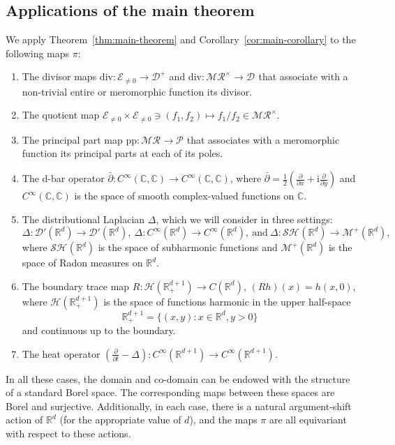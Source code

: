 \documentclass[12pt]{paper}
\numberwithin{equation}{section}
\theoremstyle{plain}
\theoremstyle{definition}
\newcommand{\C}{\mathbb{C}}
\newcommand{\R}{\mathbb{R}}
\newcommand{\Rd}{\mathbb{R}^{d}}
\newcommand{\im}{\mathrm{i}} %
\newcommand{\smooth}[2][]{C^{\infty}_{#1}(#2)}
\newcommand{\smoothCC}{\smooth{\C,\C}}
\newcommand{\measp}[2][]{\mathcal{M}_{#1}^+(#2)}
\newcommand{\distrib}[1]{\mathscr{D}'(#1)}
\newcommand{\merom}[1][]{\mathcal{MR}_{#1}}
\newcommand{\meromnz}{\merom^{\times}}
\newcommand{\holom}[1][]{\mathcal{E}_{#1}}
\newcommand{\divis}[1][]{\mathcal{D}_{#1}}
\newcommand{\divisp}[1][]{\divis[#1]^{+}}
\newcommand{\ppart}{\mathcal{P}}
\newcommand{\sharm}[2][]{\mathcal{SH}_{#1}(#2)}
\newcommand{\dm}{\mathrm{div}}      %
\newcommand{\ppm}{\mathrm{pp}}      %
\begin{document}
\subsection{Applications of the main theorem}
\noindent We apply Theorem~\ref{thm:main-theorem} and Corollary~\ref{cor:main-corollary} to the
following maps \(\pi\):
\begin{enumerate}[leftmargin=.6cm, label={\sf \arabic*}., ref={\sf \arabic*}]
\item The divisor maps \(\dm : \holom[\ne 0] \to \divisp\) and \(\dm : \meromnz \to \divis\) that
  associate with a non-trivial entire or meromorphic function its divisor.
\item The quotient map \(\holom[\ne 0] \times \holom[\ne 0] \ni (f_{1}, f_{2}) \mapsto f_{1}/f_{2}
  \in \meromnz\).
\item The principal part map \(\ppm : \merom \to \ppart\) that associates with a meromorphic
  function its principal parts at each of its poles.
\item The d-bar operator \(\bar{\partial} : \smoothCC \to \smoothCC\), where
  \(\bar{\partial} = \frac{1}{2}(\frac{\partial}{\partial x} + \im \frac{\partial}{\partial y})\)
  and \(\smoothCC\) is the space of smooth complex-valued functions on \(\C\).
\item The distributional Laplacian \( \Delta \), which we will consider in three settings:
  \[ \Delta: \distrib{\Rd} \to \distrib{\Rd} ,\ \Delta\colon C^\infty(\Rd) \to C^\infty(\Rd) , \
    \text{and} \ \Delta : \sharm{\Rd} \to \measp{\Rd},\]
  where \(\sharm{\Rd}\) is the space of subharmonic functions and \(\measp{\Rd}\) is the space of
  Radon measures on \(\Rd\).
\item The boundary trace map \( R: \mathcal H (\R^{d+1}_+) \to C(\Rd) \), \( (Rh)(x)=h(x, 0) \),
  where \( \mathcal H(\R^{d+1}_+) \) is the space of functions harmonic in the upper half-space
  \[ \R^{d+1}_+ = \{(x, y): x\in\Rd, y>0 \} \] and continuous up to the boundary.
\item The heat operator
  \((\frac{\partial}{\partial t} - \Delta) : \smooth{\R^{d+1}} \to \smooth{\R^{d+1}}\).
\end{enumerate}

In all these cases, the domain and co-domain can be endowed with the structure of a standard Borel
space.  The corresponding maps between these spaces are Borel and surjective.  Additionally, in each
case, there is a natural argument-shift action of \(\Rd\) (for the appropriate value of \(d\)),
and the maps \(\pi\) are all equivariant with respect to these actions.
\end{document}
